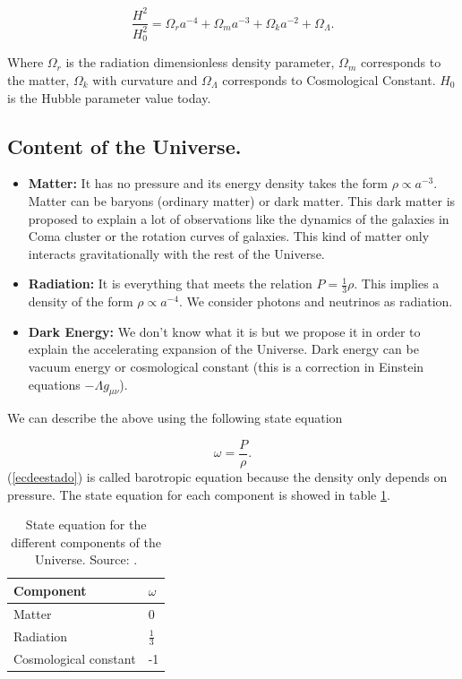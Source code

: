 \documentclass[onecolumn,           %
               showpacs,            %
               preprintnumbers,     %
               aps,                 %
               prl,          	    %
               letterpaper,             %
               superscriptaddress,      %
               nofootinbib,         %
               tightenlines,        %
               floats,floatfix      %
               ,usenatbib,
               ]{revtex4-1}
\begin{document}
\begin{equation}
\frac{H^2}{H_0^2} = \Omega_r a^{-4} + \Omega_m a^{-3} + \Omega_k a^{-2} + \Omega_{\Lambda} .
\end{equation}

Where $\Omega_r$ is the radiation dimensionless density parameter, $\Omega_m$ corresponds to the matter, $\Omega_k$ with curvature and $\Omega_{\Lambda}$ corresponds to Cosmological Constant. $H_0$ is the Hubble parameter value today.

\subsection{Content of the Universe.}

\begin{itemize}
	\item \textbf{Matter:} It has no pressure and its energy density takes the form $\rho \propto a^{-3}.$ Matter can be baryons (ordinary matter) or dark matter. This dark matter is proposed to explain a lot of observations like the dynamics of the galaxies in Coma cluster or the rotation curves of galaxies. This kind of matter only interacts gravitationally with the rest of the Universe.
	\item \textbf{Radiation:} It is everything that meets the relation $P = \frac{1}{3} \rho$. This implies a density of the form $\rho \propto a^{-4}$. We consider photons and neutrinos as radiation.
	\item \textbf{Dark Energy:} We don't know what it is but we propose it in order to explain the accelerating expansion of the Universe. Dark energy can be vacuum energy or cosmological constant (this is a correction in Einstein equations $-\Lambda g_{\mu \nu}$).
\end{itemize}

We can describe the above using the following state equation

\begin{equation}
\label{ecdeestado}
\omega = \frac{P}{\rho}.
\end{equation}
(\ref{ecdeestado}) is called barotropic equation because the density only depends on pressure. The state equation for each component is showed in table \ref{state}.

\begin{table} [htbp]
	\begin{center}
		\begin{tabular}{|l|l|}
			\hline
			Component & $\omega$\\
			\hline
			Matter & 0 \\
			\hline
			Radiation & $\frac{1}{3}$\\
			\hline
			Cosmological constant & -1 \\
			\hline
		\end{tabular}
		\caption{State equation for the different components of the Universe. Source: \cite{cambridge}.}
		\label{state}
	\end{center}
\end{table} 
\end{document}
